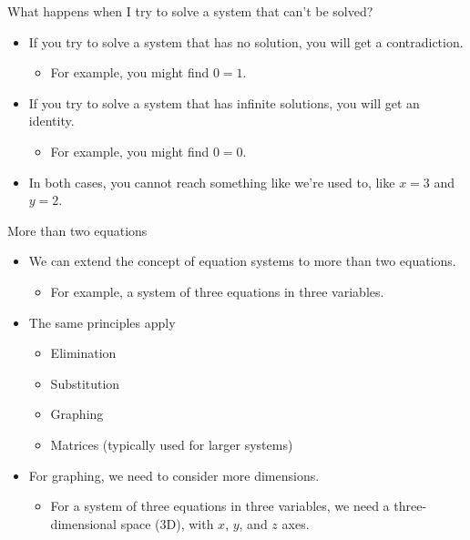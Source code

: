 \documentclass[
  10pt,
  ignorenonframetext,
]{beamer}
\providecommand{\tightlist}{%
  \setlength{\itemsep}{0pt}\setlength{\parskip}{0pt}}\usepackage{longtable,booktabs,array}
\begin{document}
\begin{frame}{What happens when I try to solve a system that can't be
solved?}
\label{what-happens-when-i-try-to-solve-a-system-that-cant-be-solved}
\begin{itemize}
\tightlist
\item
  If you try to solve a system that has no solution, you will get a
  contradiction.

  \begin{itemize}
  \tightlist
  \item
    For example, you might find \(0 = 1\).
  \end{itemize}
\item
  If you try to solve a system that has infinite solutions, you will get
  an identity.

  \begin{itemize}
  \tightlist
  \item
    For example, you might find \(0 = 0\).
  \end{itemize}
\item
  In both cases, you cannot reach something like we're used to, like
  \(x = 3\) and \(y = 2\).
\end{itemize}
\end{frame}

\begin{frame}{More than two equations}
\label{more-than-two-equations}
\begin{itemize}
\tightlist
\item
  We can extend the concept of equation systems to more than two
  equations.

  \begin{itemize}
  \tightlist
  \item
    For example, a system of three equations in three variables.
  \end{itemize}
\item
  The same principles apply

  \begin{itemize}
  \tightlist
  \item
    Elimination
  \item
    Substitution
  \item
    Graphing
  \item
    Matrices (typically used for larger systems)
  \end{itemize}
\item
  For graphing, we need to consider more dimensions.

  \begin{itemize}
  \tightlist
  \item
    For a system of three equations in three variables, we need a
    three-dimensional space (3D), with \(x\), \(y\), and \(z\) axes.
  \end{itemize}
\end{itemize}
\end{frame}
\end{document}
